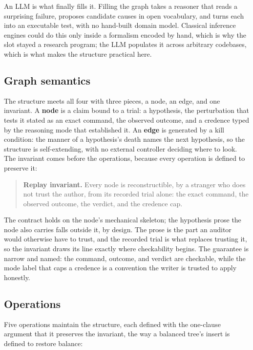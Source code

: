 \documentclass[
  10pt,
]{article}
\begin{document}
An LLM is what finally fills it. Filling the graph takes a reasoner that
reads a surprising failure, proposes candidate causes in open
vocabulary, and turns each into an executable test, with no hand-built
domain model. Classical inference engines could do this only inside a
formalism encoded by hand, which is why the slot stayed a research
program; the LLM populates it across arbitrary codebases, which is what
makes the structure practical here.

\subsection{Graph semantics}\label{graph-semantics}

The structure meets all four with three pieces, a node, an edge, and one
invariant. A \textbf{node} is a claim bound to a trial: a hypothesis,
the perturbation that tests it stated as an exact command, the observed
outcome, and a credence typed by the reasoning mode that established it.
An \textbf{edge} is generated by a kill condition: the manner of a
hypothesis's death names the next hypothesis, so the structure is
self-extending, with no external controller deciding where to look. The
invariant comes before the operations, because every operation is
defined to preserve it:

\begin{quote}
\textbf{Replay invariant.} Every node is reconstructible, by a stranger
who does not trust the author, from its recorded trial alone: the exact
command, the observed outcome, the verdict, and the credence cap.
\end{quote}

The contract holds on the node's mechanical skeleton; the hypothesis
prose the node also carries falls outside it, by design. The prose is
the part an auditor would otherwise have to trust, and the recorded
trial is what replaces trusting it, so the invariant draws its line
exactly where checkability begins. The guarantee is narrow and named:
the command, outcome, and verdict are checkable, while the mode label
that caps a credence is a convention the writer is trusted to apply
honestly.

\subsection{Operations}\label{operations}

Five operations maintain the structure, each defined with the one-clause
argument that it preserves the invariant, the way a balanced tree's
insert is defined to restore balance:
\end{document}
